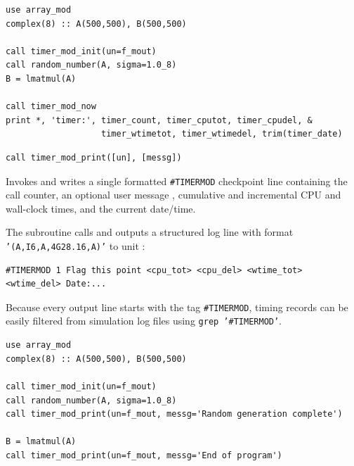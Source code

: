 \lstset{language=[95]Fortran}
\begin{lstlisting}
use array_mod
complex(8) :: A(500,500), B(500,500)

call timer_mod_init(un=f_mout)
call random_number(A, sigma=1.0_8)
B = lmatmul(A)

call timer_mod_now
print *, 'timer:', timer_count, timer_cputot, timer_cpudel, &
                   timer_wtimetot, timer_wtimedel, trim(timer_date)
\end{lstlisting}


\lstset{language=[95]Fortran}
\begin{lstlisting}
call timer_mod_print([un], [messg])
\end{lstlisting}

Invokes  and writes a single formatted \texttt{\#TIMERMOD} checkpoint line containing the call counter, an optional user message , cumulative and incremental CPU and wall-clock times, and the current date/time.

The subroutine  calls  and outputs a structured log line with format \texttt{'(A,I6,A,4G28.16,A)'} to unit :
\begin{verbatim}
#TIMERMOD 1 Flag this point <cpu_tot> <cpu_del> <wtime_tot> <wtime_del> Date:...
\end{verbatim}
Because every output line starts with the tag \texttt{\#TIMERMOD}, timing records can be easily filtered from simulation log files using \texttt{grep '\#TIMERMOD'}.

\begin{description}[leftmargin=2.2cm, style=nextline]
\end{description}

\lstset{language=[95]Fortran}
\begin{lstlisting}
use array_mod
complex(8) :: A(500,500), B(500,500)

call timer_mod_init(un=f_mout)
call random_number(A, sigma=1.0_8)
call timer_mod_print(un=f_mout, messg='Random generation complete')

B = lmatmul(A)
call timer_mod_print(un=f_mout, messg='End of program')
\end{lstlisting}
